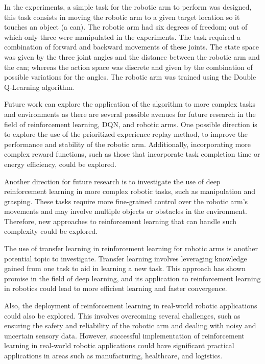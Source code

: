 \documentclass[12pt,oneside]{article}
\begin{document}
In the experiments, a simple task for the robotic arm to perform was designed, this task consists in moving the robotic arm to a given target location so it touches an object (a can). The robotic arm had six degrees of freedom; out of which only three were manipulated in the experiments. The task required a combination of forward and backward movements of these joints. The state space was given by the three joint angles and the distance between the robotic arm and the can; whereas the action space was discrete and given by the combination of possible variations for the angles. The robotic arm was trained using the Double Q-Learning algorithm.

Future work can explore the application of the algorithm to more complex tasks and environments as there are several possible avenues for future research in the field of reinforcement learning, DQN, and robotic arms. One possible direction is to explore the use of the prioritized experience replay method, to improve the performance and stability of the robotic arm. Additionally, incorporating more complex reward functions, such as those that incorporate task completion time or energy efficiency, could be explored.

Another direction for future research is to investigate the use of deep reinforcement learning in more complex robotic tasks, such as manipulation and grasping. These tasks require more fine-grained control over the robotic arm's movements and may involve multiple objects or obstacles in the environment. Therefore, new approaches to reinforcement learning that can handle such complexity could be explored.

The use of transfer learning in reinforcement learning for robotic arms is another potential topic to investigate. Transfer learning involves leveraging knowledge gained from one task to aid in learning a new task. This approach has shown promise in the field of deep learning, and its application to reinforcement learning in robotics could lead to more efficient learning and faster convergence.

Also, the deployment of reinforcement learning in real-world robotic applications could also be explored. This involves overcoming several challenges, such as ensuring the safety and reliability of the robotic arm and dealing with noisy and uncertain sensory data. However, successful implementation of reinforcement learning in real-world robotic applications could have significant practical applications in areas such as manufacturing, healthcare, and logistics.
\end{document}
